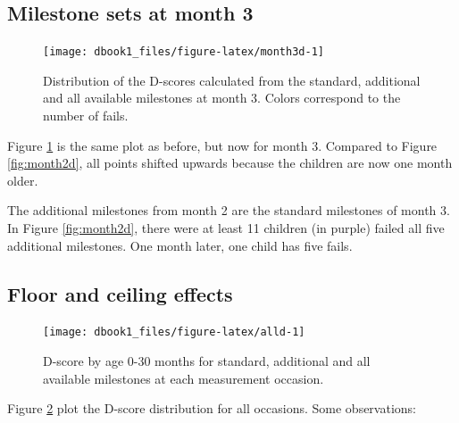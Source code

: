 \documentclass[
]{book}
\begin{document}
\hypertarget{milestone-sets-at-month-3}{%
\subsection{Milestone sets at month 3}\label{milestone-sets-at-month-3}}

\begin{figure}

{\centering \texttt{[image: dbook1\_files/figure-latex/month3d-1]} 

}

\caption{Distribution of the D-scores calculated from the standard, additional and all available milestones at month 3. Colors correspond to the number of fails.}\label{fig:month3d}
\end{figure}



Figure \ref{fig:month3d} is the same plot as before, but now for month 3. Compared to Figure \ref{fig:month2d}, all points shifted upwards because the children are now one month older.

The additional milestones from month 2 are the standard milestones of month 3. In Figure \ref{fig:month2d}, there were at least 11 children (in purple) failed all five additional milestones. One month later, one child has five fails.

\hypertarget{floor-and-ceiling-effects}{%
\subsection{Floor and ceiling effects}\label{floor-and-ceiling-effects}}

\begin{figure}

{\centering \texttt{[image: dbook1\_files/figure-latex/alld-1]} 

}

\caption{D-score by age 0-30 months for standard, additional and all available milestones at each measurement occasion.}\label{fig:alld}
\end{figure}



Figure \ref{fig:alld} plot the D-score distribution for all occasions. Some observations:
\end{document}
